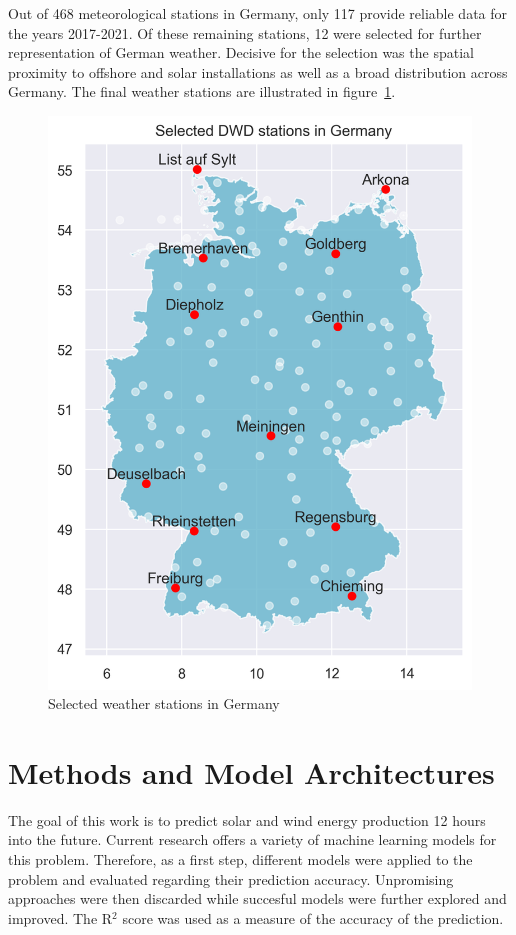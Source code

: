 \documentclass[11pt,table]{article}
\begin{document}
Out of 468 meteorological stations in Germany, only 117 provide reliable data for the years 2017-2021. Of these remaining stations, 12 were selected for further representation of German weather. Decisive for the selection was the spatial proximity to offshore and solar installations as well as a broad distribution across Germany. The final weather stations are illustrated in figure~\ref{fig:weatherStations}.
\begin{figure}[H]
	\centering
	\includegraphics[scale=0.5]{Figures/weatherStations.png}
	\caption{Selected weather stations in Germany}
	\label{fig:weatherStations}
\end{figure}

\section{Methods and Model Architectures}

The goal of this work is to predict solar and wind energy production 12 hours into the future. Current research offers a variety of machine learning models for this problem. Therefore, as a first step, different models were applied to the problem and evaluated regarding their prediction accuracy. Unpromising approaches were then discarded while succesful models were further explored and improved. The R$^2$ score was used as a measure of the accuracy of the prediction.
\end{document}

